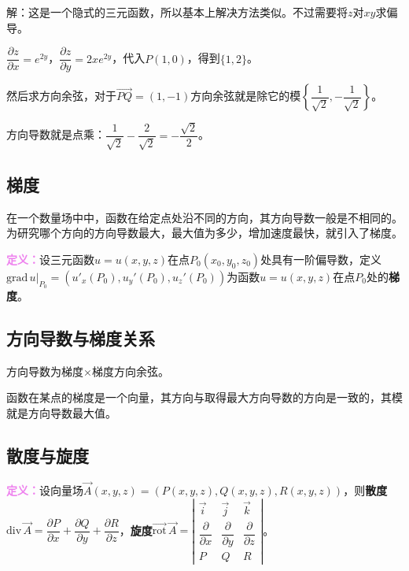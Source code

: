 \documentclass[UTF8, 12pt]{ctexart}
\begin{document}
解：这是一个隐式的三元函数，所以基本上解决方法类似。不过需要将$z$对$xy$求偏导。

$\dfrac{\partial z}{\partial x}=e^{2y}$，$\dfrac{\partial z}{\partial y}=2xe^{2y}$，代入$P(1,0)$，得到$\{1,2\}$。

然后求方向余弦，对于$\overrightarrow{PQ}=(1,-1)$方向余弦就是除它的模$\left\{\dfrac{1}{\sqrt{2}},-\dfrac{1}{\sqrt{2}}\right\}$。

方向导数就是点乘：$\dfrac{1}{\sqrt{2}}-\dfrac{2}{\sqrt{2}}=-\dfrac{\sqrt{2}}{2}$。

\subsection{梯度}

在一个数量场中中，函数在给定点处沿不同的方向，其方向导数一般是不相同的。为研究哪个方向的方向导数最大，最大值为多少，增加速度最快，就引入了梯度。

\textcolor{violet}{\textbf{定义：}}设三元函数$u=u(x,y,z)$在点$P_0(x_0,y_0,z_0)$处具有一阶偏导数，定义$\text{grad}\,u|_{P_0}=(u'_x(P_0),u_y'(P_0),u_z'(P_0))$为函数$u=u(x,y,z)$在点$P_0$处的\textbf{梯度}。

\subsection{方向导数与梯度关系}

方向导数为梯度×梯度方向余弦。

函数在某点的梯度是一个向量，其方向与取得最大方向导数的方向是一致的，其模就是方向导数最大值。

\subsection{散度与旋度}

\textcolor{violet}{\textbf{定义：}}设向量场$\vec{A}(x,y,z)=(P(x,y,z),Q(x,y,z),R(x,y,z))$，则\textbf{散度}$\textrm{div}\,\vec{A}=\dfrac{\partial P}{\partial x}+\dfrac{\partial Q}{\partial y}+\dfrac{\partial R}{\partial z}$，\textbf{旋度}$\overrightarrow{\textrm{rot}}\,\vec{A}=\left\vert\begin{array}{ccc}
    \vec{i} & \vec{j} & \vec{k} \\
    \dfrac{\partial}{\partial x} & \dfrac{\partial}{\partial y} & \dfrac{\partial}{\partial z} \\
    P & Q & R
\end{array}\right\vert$。
\end{document}
